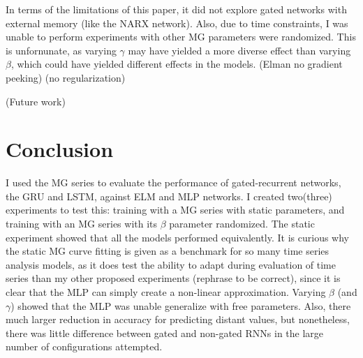 \documentclass[11pt]{article}
\begin{document}
In terms of the limitations of this paper, it did not explore gated
networks with external memory (like the NARX network). Also, due to
time constraints, I was unable to perform experiments with other MG
parameters were randomized. This is unfornunate, as varying $\gamma$
may have yielded a more diverse effect than varying $\beta$, which
could have yielded different effects in the models. (Elman no gradient
peeking) (no regularization)

(Future work)

 \section{Conclusion}
I used the MG series to evaluate the performance of gated-recurrent
networks, the GRU and LSTM, against ELM and MLP networks. I created
two(three) experiments to test this: training with a MG series with
static parameters, and training with an MG series with its $\beta$
parameter randomized. The static experiment showed that all the models performed
equivalently.
It is curious why the static MG curve fitting is given as a benchmark
for so many time series analysis models, as it does test the ability
to adapt during evaluation of time series than my other
proposed experiments (rephrase to be correct), since it is clear that
the MLP can simply create a non-linear approximation. Varying $\beta$
(and $\gamma$) showed that the MLP was unable generalize with free
parameters. Also, there much larger reduction in accuracy for
predicting distant values, but nonetheless, there was little
difference between gated and non-gated RNNs in the large number
of configurations attempted.
\end{document}
